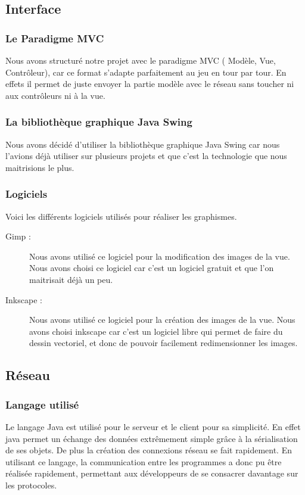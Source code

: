 \documentclass[a4paper, titlepage]{livret}
\begin{document}
    \subsection{Interface}
    \subsubsection{Le Paradigme MVC}
    Nous avons structuré notre projet avec le paradigme MVC ( Modèle, Vue, Contrôleur), car ce format s'adapte parfaitement au jeu en tour par tour. En effets il permet de juste envoyer la partie modèle avec le réseau sans toucher ni aux contrôleurs ni à la vue.   
    \subsubsection{La bibliothèque graphique Java Swing}
    Nous avons décidé d'utiliser la bibliothèque graphique Java Swing car nous l'avions déjà utiliser sur plusieurs projets et que c'est la technologie que nous maitrisions le plus.
    \subsubsection{Logiciels}
    Voici les différents logiciels utilisés pour réaliser les graphismes.

    \begin{description}
      \item[Gimp :] Nous avons utilisé ce logiciel pour la modification des images de la vue. Nous avons choisi ce logiciel car c'est un logiciel gratuit et que l'on maitrisait déjà un peu. 
      \item[Inkscape :] Nous avons utilisé ce logiciel pour la création des images de la vue. Nous avons choisi inkscape car c'est un logiciel libre qui permet de faire du dessin vectoriel, et donc de pouvoir facilement redimensionner les images. 
    \end{description}



\subsection{Réseau}

\subsubsection{Langage utilisé}
Le langage Java est utilisé pour le serveur et le client pour sa simplicité. En effet java permet un échange des données extrêmement simple grâce à la sérialisation de ses objets. De plus la création des connexions réseau se fait rapidement.
En utilisant ce langage, la communication entre les programmes a donc pu être réalisée rapidement, permettant aux développeurs de se consacrer davantage sur les protocoles.
\end{document}
